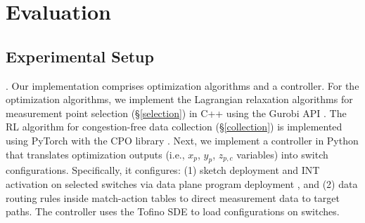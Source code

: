 \section{Evaluation}\label{eval}



\subsection{Experimental Setup}\label{setup}

. Our implementation comprises optimization algorithms and a controller. For the optimization algorithms, we implement the Lagrangian relaxation algorithms for measurement point selection (\S\ref{selection}) in C++ using the Gurobi API \cite{gurobi}. The RL algorithm for congestion-free data collection (\S\ref{collection}) is implemented using PyTorch with the CPO library \cite{pytorch}. Next, we implement a controller in Python that translates optimization outputs (i.e., \(x_p\), \(y_p\), \(z_{p,c}\) variables) into switch configurations. Specifically, it configures: (1) sketch deployment and INT activation on selected switches via data plane program deployment \cite{chen2020speed,gao2020lyra}, and (2) data routing rules inside match-action tables to direct measurement data to target paths. The controller uses the Tofino SDE \cite{tofino2} to load configurations on switches.

